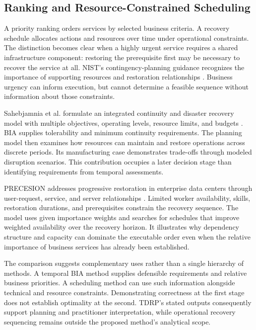 \subsection{Ranking and Resource-Constrained Scheduling}
\label{sec:lr_sequencing}

A priority ranking orders services by selected business criteria. A recovery schedule allocates actions and resources over time under operational constraints. The distinction becomes clear when a highly urgent service requires a shared infrastructure component: restoring the prerequisite first may be necessary to recover the service at all. NIST's contingency-planning guidance recognizes the importance of supporting resources and restoration relationships \cite{nist2010contingency}. Business urgency can inform execution, but cannot determine a feasible sequence without information about those constraints.

Sahebjamnia et al. formulate an integrated continuity and disaster recovery model with multiple objectives, operating levels, resource limits, and budgets \cite{sahebjamnia2015integrated}. BIA supplies tolerability and minimum continuity requirements. The planning model then examines how resources can maintain and restore operations across discrete periods. Its manufacturing case demonstrates trade-offs through modeled disruption scenarios. This contribution occupies a later decision stage than identifying requirements from temporal assessments.

PRECESION addresses progressive restoration in enterprise data centers through user-request, service, and server relationships \cite{elshekeil2017precesion}. Limited worker availability, skills, restoration durations, and prerequisites constrain the recovery sequence. The model uses given importance weights and searches for schedules that improve weighted availability over the recovery horizon. It illustrates why dependency structure and capacity can dominate the executable order even when the relative importance of business services has already been established.

The comparison suggests complementary uses rather than a single hierarchy of methods. A temporal BIA method supplies defensible requirements and relative business priorities. A scheduling method can use such information alongside technical and resource constraints. Demonstrating correctness at the first stage does not establish optimality at the second. TDRP's stated outputs consequently support planning and practitioner interpretation, while operational recovery sequencing remains outside the proposed method's analytical scope.

